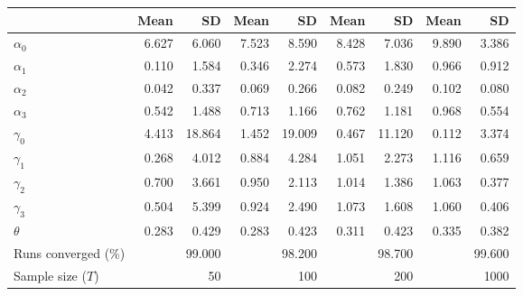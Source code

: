 
\begin{tabular}[t]{lrrrrrrrr}
\toprule
  & Mean & SD & Mean  & SD  & Mean   & SD   & Mean    & SD   \\
\midrule
$\alpha_{0}$ & 6.627 & 6.060 & 7.523 & 8.590 & 8.428 & 7.036 & 9.890 & 3.386\\
$\alpha_{1}$ & 0.110 & 1.584 & 0.346 & 2.274 & 0.573 & 1.830 & 0.966 & 0.912\\
$\alpha_{2}$ & 0.042 & 0.337 & 0.069 & 0.266 & 0.082 & 0.249 & 0.102 & 0.080\\
$\alpha_{3}$ & 0.542 & 1.488 & 0.713 & 1.166 & 0.762 & 1.181 & 0.968 & 0.554\\
$\gamma_{0}$ & 4.413 & 18.864 & 1.452 & 19.009 & 0.467 & 11.120 & 0.112 & 3.374\\
$\gamma_{1}$ & 0.268 & 4.012 & 0.884 & 4.284 & 1.051 & 2.273 & 1.116 & 0.659\\
$\gamma_{2}$ & 0.700 & 3.661 & 0.950 & 2.113 & 1.014 & 1.386 & 1.063 & 0.377\\
$\gamma_{3}$ & 0.504 & 5.399 & 0.924 & 2.490 & 1.073 & 1.608 & 1.060 & 0.406\\
$\theta$ & 0.283 & 0.429 & 0.283 & 0.423 & 0.311 & 0.423 & 0.335 & 0.382\\
Runs converged (\%) &  & 99.000 &  & 98.200 &  & 98.700 &  & 99.600\\
Sample size ($T$) &  & 50 &  & 100 &  & 200 &  & 1000\\
\bottomrule
\end{tabular}
